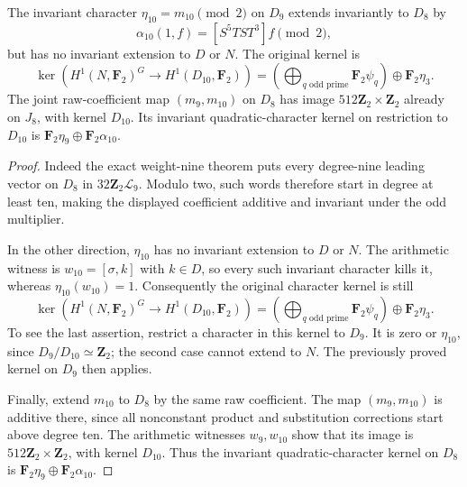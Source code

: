 \begin{proposition}\label{prop:eta-ten-extension-kernels}
The invariant character $\eta_{10}=m_{10}\pmod2$ on $D_9$ extends
invariantly to $D_8$ by
\[
 \alpha_{10}(1,f)=[S^5TST^3]f\pmod2,
\]
but has no invariant extension to $D$ or $N$. The original kernel is
\[
 \ker\!\left(H^1(N,\mathbf F_2)^G
                  \longrightarrow H^1(D_{10},\mathbf F_2)\right)
 =\left(\bigoplus_{q\text{ odd prime}}\mathbf F_2\psi_q\right)
                  \oplus\mathbf F_2\eta_3.
\]
The joint raw-coefficient map $(m_9,m_{10})$ on $D_8$ has image
$512\mathbf Z_2\times\mathbf Z_2$ already on $J_8$, with kernel
$D_{10}$. Its invariant quadratic-character kernel on restriction
to $D_{10}$ is $\mathbf F_2\eta_9\oplus\mathbf F_2\alpha_{10}$.
\end{proposition}
\begin{proof}
Indeed the exact weight-nine theorem puts every degree-nine leading
vector on $D_8$ in $32\mathbf Z_2\mathcal L_9$. Modulo two, such
words therefore start in degree at least ten, making the displayed
coefficient additive and invariant under the odd multiplier.

In the other direction, $\eta_{10}$ has no invariant extension to
$D$ or $N$. The arithmetic witness is $w_{10}=[\sigma,k]$ with
$k\in D$, so every such invariant character kills it, whereas
$\eta_{10}(w_{10})=1$. Consequently the original character kernel
is still
\[
 \ker\!\left(H^1(N,\mathbf F_2)^G
                  \longrightarrow H^1(D_{10},\mathbf F_2)\right)
 =\left(\bigoplus_{q\text{ odd prime}}\mathbf F_2\psi_q\right)
                  \oplus\mathbf F_2\eta_3.
\]
To see the last assertion, restrict a character in this kernel to
$D_9$. It is zero or $\eta_{10}$, since $D_9/D_{10}\simeq\mathbf Z_2$;
the second case cannot extend to $N$. The previously proved kernel
on $D_9$ then applies.

Finally, extend $m_{10}$ to $D_8$ by the same raw coefficient.
The map $(m_9,m_{10})$ is additive there, since all
nonconstant product and substitution corrections start above
degree ten. The arithmetic witnesses $w_9,w_{10}$ show that its
image is $512\mathbf Z_2\times\mathbf Z_2$, with kernel $D_{10}$.
Thus the invariant quadratic-character kernel on $D_8$ is
$\mathbf F_2\eta_9\oplus\mathbf F_2\alpha_{10}$.

\end{proof}


